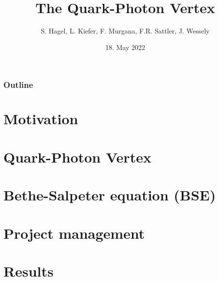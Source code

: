 \documentclass[pt12]{beamer}
\title[ECT* DTP 2022]{The Quark-Photon Vertex}
\author{S. Hagel, L. Kiefer, F. Murgana, F.R. Sattler, J. Wessely}
\date{18. May 2022}
\begin{document}
  \begin{frame}[plain]
    \titlepage
  \end{frame}

  \begin{frame}[label=outline]\frametitle{Outline}
    \tableofcontents
  \end{frame}

  \section{Motivation}
  


  \section{Quark-Photon Vertex}
    

  \section{Bethe-Salpeter equation (BSE)}
    
    
    
    

  \section{Project management}
    

  \section{Results}
    
\end{document}
